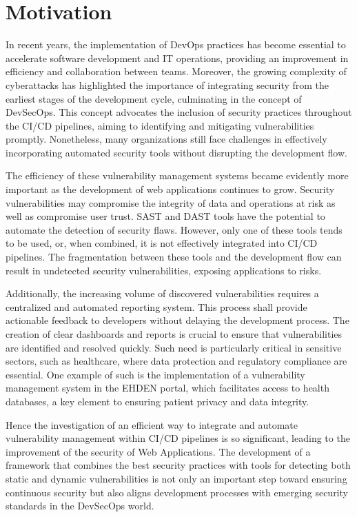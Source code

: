 \section{Motivation}

In recent years, the implementation of DevOps practices has become essential to accelerate software development and IT operations, providing an improvement in efficiency and collaboration between teams. Moreover, the growing complexity of cyberattacks has highlighted the importance of integrating security from the earliest stages of the development cycle, culminating in the concept of DevSecOps. This concept advocates the inclusion of security practices throughout the CI/CD pipelines, aiming to identifying and mitigating vulnerabilities promptly. Nonetheless, many organizations still face challenges in effectively incorporating automated security tools without disrupting the development flow.

The efficiency of these vulnerability management systems became evidently more important as the development of web applications continues to grow. Security vulnerabilities may compromise the integrity of data and operations at risk as well as compromise user trust. SAST and DAST tools have the potential to automate the detection of security flaws. However, only one of these tools tends to be used, or, when combined, it is not effectively integrated into CI/CD pipelines. The fragmentation between these tools and the development flow can result in undetected security vulnerabilities, exposing applications to risks.

Additionally, the increasing volume of discovered vulnerabilities requires a centralized and automated reporting system. This process shall provide actionable feedback to developers without delaying the development process. The creation of clear dashboards and reports is crucial to ensure that vulnerabilities are identified and resolved quickly. Such need is particularly critical in sensitive sectors, such as healthcare, where data protection and regulatory compliance are essential. One example of such is the implementation of a vulnerability management system in the EHDEN portal, which facilitates access to health databases, a key element to ensuring patient privacy and data integrity.

Hence the investigation of an efficient way to integrate and automate vulnerability management within CI/CD pipelines is so significant, leading to the improvement of the security of Web Applications. The development of a framework that combines the best security practices with tools for detecting both static and dynamic vulnerabilities is not only an important step toward ensuring continuous security but also aligns development processes with emerging security standards in the DevSecOps world.

